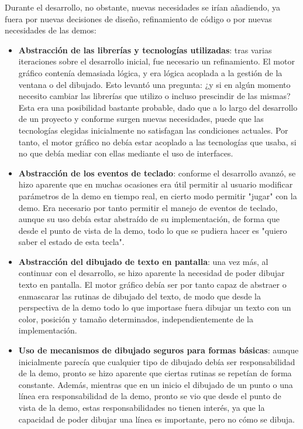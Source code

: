 Durante el desarrollo, no obstante, nuevas necesidades se irían añadiendo, ya fuera por nuevas decisiones de diseño, refinamiento de código o por nuevas necesidades de las demos:
\begin{itemize}
	\item \textbf{Abstracción de las librerías y tecnologías utilizadas}: tras varias iteraciones sobre el desarrollo inicial, fue necesario un refinamiento. El motor gráfico contenía demasiada lógica, y era lógica acoplada a la gestión de la ventana o del dibujado. Esto levantó una pregunta: ¿y si en algún momento necesito cambiar las librerías que utilizo o incluso prescindir de las mismas? Esta era una posibilidad bastante probable, dado que a lo largo del desarrollo de un proyecto y conforme surgen nuevas necesidades, puede que las tecnologías elegidas inicialmente no satisfagan las condiciones actuales. Por tanto, el motor gráfico no debía estar acoplado a las tecnologías que usaba, si no que debía mediar con ellas mediante el uso de interfaces.
	\item \textbf{Abstracción de los eventos de teclado}: conforme el desarrollo avanzó, se hizo aparente que en muchas ocasiones era útil permitir al usuario modificar parámetros de la demo en tiempo real, en cierto modo permitir "jugar" con la demo. Era necesario por tanto permitir el manejo de eventos de teclado, aunque su uso debía estar abstraído de su implementación, de forma que desde el punto de vista de la demo, todo lo que se pudiera hacer es "quiero saber el estado de esta tecla".
	\item \textbf{Abstracción del dibujado de texto en pantalla}: una vez más, al continuar con el desarrollo, se hizo aparente la necesidad de poder dibujar texto en pantalla. El motor gráfico debía ser por tanto capaz de abstraer o enmascarar las rutinas de dibujado del texto, de modo que desde la perspectiva de la demo todo lo que importase fuera dibujar un texto con un color, posición y tamaño determinados, independientemente de la implementación.
	\item \textbf{Uso de mecanismos de dibujado seguros para formas básicas}: aunque inicialmente parecía que cualquier tipo de dibujado debía ser responsabilidad de la demo, pronto se hizo aparente que ciertas rutinas se repetían de forma constante. Además, mientras que en un inicio el dibujado de un punto o una línea era responsabilidad de la demo, pronto se vio que desde el punto de vista de la demo, estas responsabilidades no tienen interés, ya que la capacidad de poder dibujar una línea es importante, pero no cómo se dibuja. 

\end{itemize}
